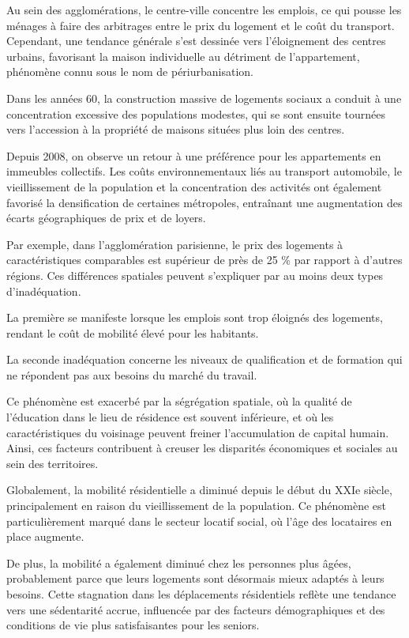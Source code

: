 \documentclass[a4paper, 12pt]{report}
\begin{document}
Au sein des agglomérations, le centre-ville concentre les emplois, ce qui pousse les ménages à faire des arbitrages entre le prix du logement et le coût du transport. Cependant, une tendance générale s'est dessinée vers l'éloignement des centres urbains, favorisant la maison individuelle au détriment de l'appartement, phénomène connu sous le nom de périurbanisation. 

Dans les années 60, la construction massive de logements sociaux a conduit à une concentration excessive des populations modestes, qui se sont ensuite tournées vers l'accession à la propriété de maisons situées plus loin des centres. 

Depuis 2008, on observe un retour à une préférence pour les appartements en immeubles collectifs. Les coûts environnementaux liés au transport automobile, le vieillissement de la population et la concentration des activités ont également favorisé la densification de certaines métropoles, entraînant une augmentation des écarts géographiques de prix et de loyers.

Par exemple, dans l'agglomération parisienne, le prix des logements à caractéristiques comparables est supérieur de près de 25 \% par rapport à d'autres régions. Ces différences spatiales peuvent s'expliquer par au moins deux types d’inadéquation. 

La première se manifeste lorsque les emplois sont trop éloignés des logements, rendant le coût de mobilité élevé pour les habitants. 

La seconde inadéquation concerne les niveaux de qualification et de formation qui ne répondent pas aux besoins du marché du travail. 

Ce phénomène est exacerbé par la ségrégation spatiale, où la qualité de l'éducation dans le lieu de résidence est souvent inférieure, et où les caractéristiques du voisinage peuvent freiner l'accumulation de capital humain. Ainsi, ces facteurs contribuent à creuser les disparités économiques et sociales au sein des territoires.

Globalement, la mobilité résidentielle a diminué depuis le début du XXIe siècle, principalement en raison du vieillissement de la population. Ce phénomène est particulièrement marqué dans le secteur locatif social, où l'âge des locataires en place augmente. 

De plus, la mobilité a également diminué chez les personnes plus âgées, probablement parce que leurs logements sont désormais mieux adaptés à leurs besoins. Cette stagnation dans les déplacements résidentiels reflète une tendance vers une sédentarité accrue, influencée par des facteurs démographiques et des conditions de vie plus satisfaisantes pour les seniors.
\end{document}
